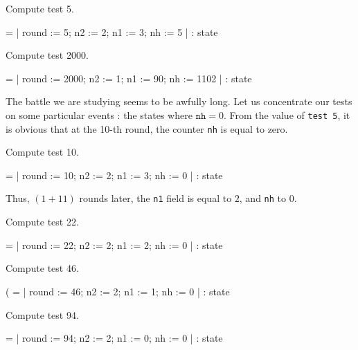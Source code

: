 \begin{Coqsrc}
Compute test 5.
\end{Coqsrc}

\begin{Coqanswer}
  = {| round := 5; n2 := 2; n1 := 3; nh := 5 |}
     : state
\end{Coqanswer}

\begin{Coqsrc}
Compute test 2000.
\end{Coqsrc}

\begin{Coqanswer}
  = {| round := 2000; n2 := 1; n1 := 90; nh := 1102 |}
     : state
\end{Coqanswer}


The battle we are studying seems to be awfully long. Let us concentrate our
tests on some particular events : the states where $\texttt{nh}=0$.
From the value of \texttt{test 5},  it is obvious that at the 10-th round, the counter \texttt{nh} is equal to zero.

 \begin{Coqsrc}
 Compute test 10.
\end{Coqsrc}

\begin{Coqanswer}
    = {| round := 10; n2 := 2; n1 := 3; nh := 0 |}
     : state
 \end{Coqanswer}

Thus, $ (1 + 11)$ rounds later, the \texttt{n1} field is equal to $2$, and 
\texttt{nh}   to $0$. 


\begin{Coqsrc}
Compute test 22.
\end{Coqsrc}

\begin{Coqanswer}
 = {| round := 22; n2 := 2; n1 := 2; nh := 0 |}
     : state
\end{Coqanswer}


\begin{Coqsrc}
 Compute test 46.
\end{Coqsrc}

\begin{Coqanswer}
( = {| round := 46; n2 := 2; n1 := 1; nh := 0 |}
     : state
\end{Coqanswer}


\begin{Coqsrc}
Compute test 94.
\end{Coqsrc}

\begin{Coqanswer}
 = {| round := 94; n2 := 2; n1 := 0; nh := 0 |}
     : state
\end{Coqanswer}


